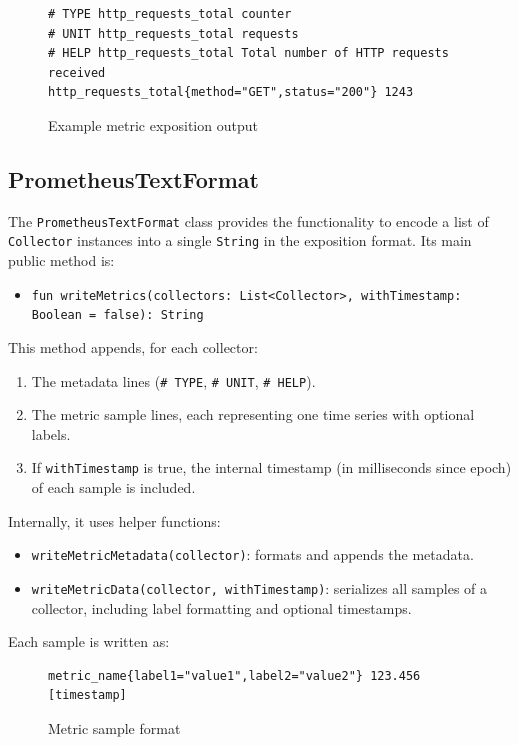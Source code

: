 \begin{figure}[h]
    \begin{lstlisting}
# TYPE http_requests_total counter
# UNIT http_requests_total requests
# HELP http_requests_total Total number of HTTP requests received
http_requests_total{method="GET",status="200"} 1243
    \end{lstlisting}
    \caption{Example metric exposition output}
\end{figure}

\subsection{PrometheusTextFormat}\label{subsec:prometheustextformat}

The \texttt{PrometheusTextFormat} class provides the functionality to encode a list of \texttt{Collector} instances into a single \texttt{String} in the exposition format.
Its main public method is:

\begin{itemize}
    \item \texttt{fun writeMetrics(collectors: List<Collector>, withTimestamp: Boolean = false): String}
\end{itemize}

This method appends, for each collector:

\begin{enumerate}
    \item The metadata lines (\texttt{\# TYPE}, \texttt{\# UNIT}, \texttt{\# HELP}).
    \item The metric sample lines, each representing one time series with optional labels.
    \item If \texttt{withTimestamp} is true, the internal timestamp (in milliseconds since epoch) of each sample is included.
\end{enumerate}

Internally, it uses helper functions:

\begin{itemize}
    \item \texttt{writeMetricMetadata(collector)}: formats and appends the metadata.
    \item \texttt{writeMetricData(collector, withTimestamp)}: serializes all samples of a collector, including label formatting and optional timestamps.
\end{itemize}

Each sample is written as:

\begin{figure}[h]
    \begin{lstlisting}
metric_name{label1="value1",label2="value2"} 123.456 [timestamp]
    \end{lstlisting}
    \caption{Metric sample format}
\end{figure}

